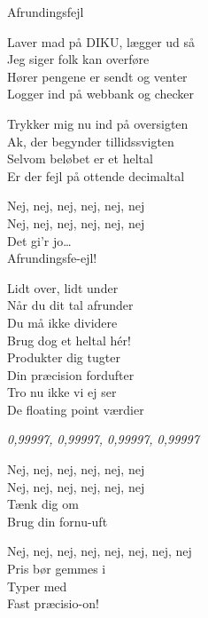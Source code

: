 \begin{song}{Afrundingsfejl}
  \begin{SBVerse}
    Laver mad på DIKU, lægger ud så\\
    Jeg siger folk kan overføre\\
    Hører pengene er sendt og venter\\
    Logger ind på webbank og checker
  \end{SBVerse}

  \begin{SBVerse}
    Trykker mig nu ind på oversigten\\
    Ak, der begynder tillidssvigten\\
    Selvom beløbet er et heltal\\
    Er der fejl på ottende decimaltal
  \end{SBVerse}

  \begin{SBSection*}
    Nej, nej, nej, nej, nej, nej\\
    Nej, nej, nej, nej, nej, nej\\
    Det gi'r jo\ldots\\
    Afrundingsfe-ejl!
  \end{SBSection*}

  \begin{SBChorus}
    Lidt over, lidt under\\
    Når du dit tal afrunder\\
    Du må ikke dividere\\
    Brug dog et heltal hér!\\
    \medskip
    Produkter dig tugter\\
    Din præcision fordufter\\
    Tro nu ikke vi ej ser\\
    De floating point værdier
  \end{SBChorus}

  \begin{SBSection*}
    \emph{0,99997, 0,99997, 0,99997, 0,99997}
  \end{SBSection*}

  \begin{SBSection*}
    Nej, nej, nej, nej, nej, nej\\
    Nej, nej, nej, nej, nej, nej\\
    Tænk dig om\\
    Brug din fornu-uft
  \end{SBSection*}

  \begin{SBSection*}
    Nej, nej, nej, nej, nej, nej, nej, nej\\
    Pris bør gemmes i\\
    Typer med\\
    Fast præcisio-on!
  \end{SBSection*}


\end{song}
